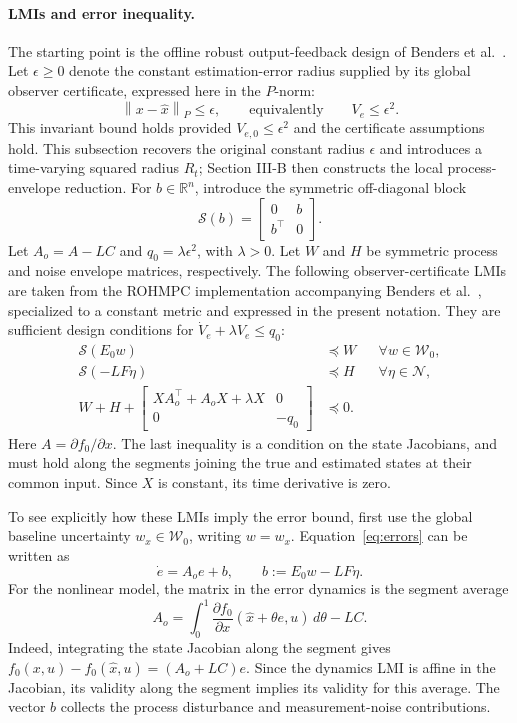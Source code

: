 \documentclass[11pt,a4paper]{article}
\numberwithin{equation}{section}
\theoremstyle{remark}\newtheorem{remark}{Remark}
\newcommand{\R}{\mathbb R}
\newcommand{\norm}[1]{\left\lVert#1\right\rVert}
\newcommand{\cW}{\mathcal W}
\begin{document}
\paragraph{LMIs and error inequality.}
The starting point is the offline robust output-feedback design of Benders et al.~\cite{benders2025}. Let $\epsilon\ge0$ denote the constant estimation-error radius supplied by its global observer certificate, expressed here in the $P$-norm:
\[
\norm{x-\hat x}_P\le\epsilon,
\qquad\text{equivalently}\qquad V_e\le\epsilon^2.
\]
This invariant bound holds provided $V_{e,0}\le\epsilon^2$ and the certificate assumptions hold. This subsection recovers the original constant radius $\epsilon$ and introduces a time-varying squared radius $R_{t}$; Section III-B then constructs the local process-envelope reduction.
For $b\in\R^n$, introduce the symmetric off-diagonal block
\begin{equation}
\mathcal S(b)=\begin{bmatrix}0&b\\b^\top&0\end{bmatrix}.
\end{equation}
Let $A_o=A-LC$ and $q_0=\lambda\epsilon^2$, with $\lambda>0$. Let $W$ and $H$ be symmetric process and noise envelope matrices, respectively. The following observer-certificate LMIs are taken from the ROHMPC implementation accompanying Benders et al.~\cite{benders2025,rohmpc}, specialized to a constant metric and expressed in the present notation. They are sufficient design conditions for $\dot V_e+\lambda V_e\le q_0$:
\begin{subequations}\label{eq:lmis}
\begin{align}
\mathcal S(E_0w)&\preceq W &&\forall w\in\cW_0,\label{eq:baseline-process}\\
\mathcal S(-LF\eta)&\preceq H &&\forall\eta\in\mathcal N,\label{eq:baseline-noise}\\
W+H+\begin{bmatrix}XA_o^\top+A_oX+\lambda X&0\\0&-q_0\end{bmatrix}&\preceq0.
\end{align}
\end{subequations}
Here $A=\partial f_0/\partial x$. The last inequality is a condition on the state Jacobians, and must hold along the segments joining the true and estimated states at their common input. Since $X$ is constant, its time derivative is zero.

To see explicitly how these LMIs imply the error bound, first use the global baseline uncertainty $w_x\in\cW_0$, writing $w=w_x$. Equation~\eqref{eq:errors} can be written as
\[
\dot e=A_oe+b,\qquad b:=E_0w-LF\eta.
\]
For the nonlinear model, the matrix in the error dynamics is the segment average
\[
A_o=\int_0^1\frac{\partial f_0}{\partial x}(\hat x+\theta e,u)\,d\theta-LC.
\]
Indeed, integrating the state Jacobian along the segment gives $f_0(x,u)-f_0(\hat x,u)=(A_o+LC)e$. Since the dynamics LMI is affine in the Jacobian, its validity along the segment implies its validity for this average. The vector $b$ collects the process disturbance and measurement-noise contributions.
\end{document}
